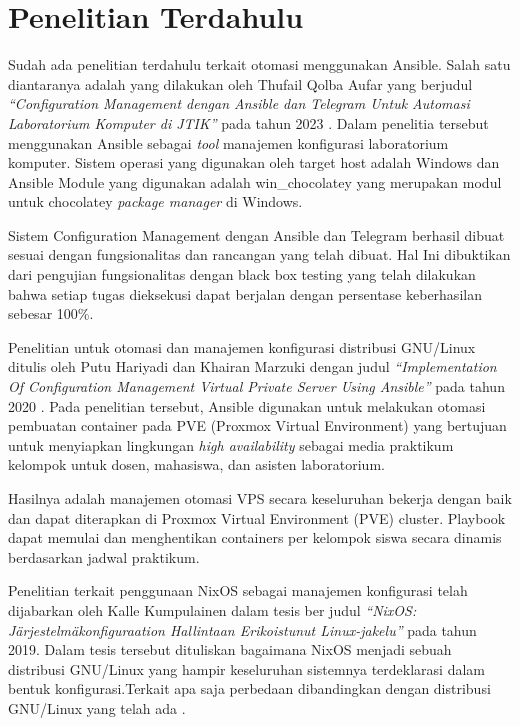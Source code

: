 \documentclass[10pt,twoside]{report}
\begin{document}
\section{Penelitian Terdahulu}
\begin{adjustwidth}{0.70cm}{}

	\hspace\parindent
	Sudah ada penelitian terdahulu terkait otomasi menggunakan Ansible. Salah
	satu diantaranya adalah yang dilakukan oleh Thufail Qolba Aufar yang
	berjudul \textit{“Configuration Management dengan Ansible dan Telegram Untuk
		Automasi Laboratorium Komputer di JTIK”} pada tahun 2023 \parencite{thufail23}. Dalam penelitia
	tersebut menggunakan Ansible sebagai \textit{tool} manajemen konfigurasi
	laboratorium komputer. Sistem operasi yang digunakan oleh target host
	adalah Windows dan Ansible Module yang digunakan adalah win\_chocolatey yang
	merupakan modul untuk chocolatey \textit{package manager} di Windows.

	Sistem Configuration Management dengan Ansible dan Telegram berhasil dibuat
	sesuai dengan fungsionalitas dan rancangan yang telah dibuat. Hal Ini
	dibuktikan dari pengujian fungsionalitas dengan black box testing yang telah
	dilakukan bahwa setiap tugas dieksekusi dapat berjalan dengan persentase
	keberhasilan sebesar 100\%.

	Penelitian untuk otomasi dan manajemen konfigurasi distribusi GNU/Linux
	ditulis oleh Putu Hariyadi dan Khairan Marzuki dengan judul \textit{“Implementation
		Of Configuration Management Virtual Private Server Using Ansible”} pada
	tahun 2020 \parencite{hariyadi2020}. Pada penelitian tersebut, Ansible digunakan untuk melakukan
	otomasi pembuatan container pada PVE (Proxmox Virtual Environment) yang
	bertujuan untuk menyiapkan lingkungan \textit{high availability} sebagai media
	praktikum kelompok untuk dosen, mahasiswa, dan asisten laboratorium.

	Hasilnya adalah manajemen otomasi VPS secara keseluruhan bekerja dengan baik
	dan dapat diterapkan di Proxmox Virtual Environment (PVE) cluster. Playbook
	dapat memulai dan menghentikan containers per kelompok siswa secara dinamis
	berdasarkan jadwal praktikum.

	Penelitian terkait penggunaan NixOS sebagai manajemen konfigurasi telah
	dijabarkan oleh Kalle Kumpulainen dalam tesis ber judul \textit{“NixOS:
		Järjestelmäkonfiguraation Hallintaan Erikoistunut Linux-jakelu”} pada tahun
	2019. Dalam tesis tersebut dituliskan bagaimana NixOS menjadi sebuah
	distribusi GNU/Linux yang hampir keseluruhan sistemnya terdeklarasi dalam
	bentuk konfigurasi.Terkait apa saja perbedaan dibandingkan dengan
	distribusi GNU/Linux yang telah ada \parencite{kumpulainen_2019_nixos}.


\end{adjustwidth}
\end{document}
